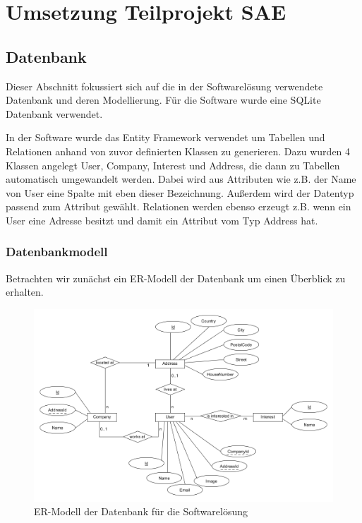 \chapter{Umsetzung Teilprojekt SAE}

\section{Datenbank}
Dieser Abschnitt fokussiert sich auf die in der Softwarelösung verwendete Datenbank und deren Modellierung. Für die Software wurde eine SQLite Datenbank verwendet.

In der Software wurde das Entity Framework verwendet um Tabellen und Relationen anhand von zuvor definierten Klassen zu generieren. Dazu wurden 4 Klassen angelegt User, Company, Interest und Address, die dann zu Tabellen automatisch umgewandelt werden. Dabei wird aus Attributen wie z.B. der Name von User eine Spalte mit eben dieser Bezeichnung. Außerdem wird der Datentyp passend zum Attribut gewählt. Relationen werden ebenso erzeugt z.B. wenn ein User eine Adresse besitzt und damit ein Attribut vom Typ Address hat.

\subsection{Datenbankmodell}
Betrachten wir zunächst ein ER-Modell der Datenbank um einen Überblick zu erhalten.

\begin{figure}[h]
	\centering
	\includegraphics[width=\linewidth]{Images/Projekt_Messe_ERModell2}
	\caption{ER-Modell der Datenbank für die Softwarelösung}
	\label{fig:projektmesseermodell}
\end{figure}

